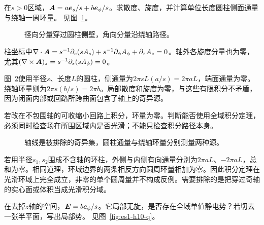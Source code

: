 \begin{exercise}[柱坐标中的径向与绕轴场]\label{ex:es1-h9}
在$s>0$区域，$\bm{A}=a\bm{e}_s/s+b\bm{e}_\phi/s$。求散度、旋度，并计算单位长度圆柱侧面通量与绕轴一周环量。 见图~\ref{fig:es1-h9-q}。
\end{exercise}

\begin{figure}[H]\centering
{}
\caption{径向分量穿过圆柱侧壁，角向分量沿绕轴路径。}\label{fig:es1-h9-q}
\end{figure}
\begin{solution}
柱坐标中$\nabla\cdot\bm{A}=s^{-1}\partial_s(sA_s)+s^{-1}\partial_\phi A_\phi+\partial_zA_z=0$。轴外各旋度分量也为零，尤其$(\nabla\times\bm{A})_z=s^{-1}\partial_s(sA_\phi)=0$。

图~\ref{fig:es1-h9-s}使用半径$s$、长度$L$的圆柱，侧通量为$2\pi sL(a/s)=2\pi aL$，端面通量为零。绕轴环量则为$2\pi s(b/s)=2\pi b$。局部散度和旋度为零，与这些有限积分不矛盾，因为闭面内部或回路所跨曲面包含了轴上的奇异源。

若改在不包围轴的可收缩小回路上积分，环量为零。判断能否使用全域积分定理，必须同时检查场在所围区域内是否光滑；不能只检查积分路径本身。
\begin{figure}[H]\centering
{}
\caption{轴线是被排除的奇异集，圆柱通量与绕轴环量分别测量两种源。}\label{fig:es1-h9-s}
\end{figure}


若用半径$s_1,s_2$围成不含轴的环柱，外侧与内侧有向通量分别为$2\pi aL$、$-2\pi aL$，总和为零。相同道理，环域边界的两条相反方向圆周环量相加为零。因此积分定理在光滑环域上完全成立，非零的单个圆周量并不构成反例。需要排除的是把穿过奇轴的实心面或体积当成光滑积分域。
\end{solution}

\begin{exercise}[绕轴场的势与分支]\label{ex:es1-h10}
在去掉$z$轴的空间，$\bm{E}=b\bm{e}_\phi/s$。它局部无旋，是否存在全域单值静电势？若切去一张半平面，写出局部势。 见图~\ref{fig:es1-h10-q}。
\end{exercise}

